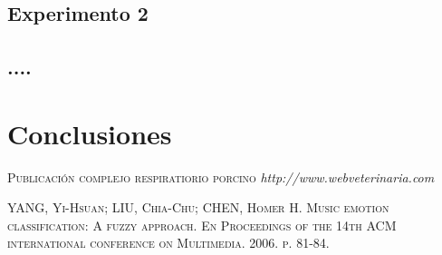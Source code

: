 \documentclass[12pt,a4paper,Spanish]{book}
\begin{document}
\section{Experimento 2} 

\section{....} 




\chapter{Conclusiones}\label{Conclusiones}




\begin{thebibliography}{99}

 \textsc{Publicación complejo respiratiorio porcino}  \textit{http://www.webveterinaria.com}
	
\textsc{
YANG, Yi-Hsuan; LIU, Chia-Chu; CHEN, Homer H. Music emotion classification: A fuzzy approach. En Proceedings of the 14th ACM international conference on Multimedia. 2006. p. 81-84.
}

\end{thebibliography}
\end{document}
